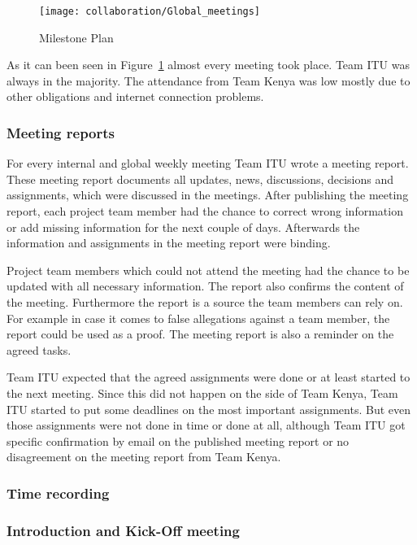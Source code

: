 	\begin{figure}[htb]
		\centering
		\texttt{[image: collaboration/Global\_meetings]}
		\caption{Milestone Plan}
		\label{fig:global_meetings}
	\end{figure}

As it can been seen in Figure~\ref{fig:global_meetings} almost every meeting took place. Team ITU was always in the majority. The attendance from Team Kenya was low mostly due to other obligations and internet connection problems.

\subsubsection {Meeting reports}

For every internal and global weekly meeting Team ITU wrote a meeting report. These meeting report documents all updates, news, discussions, decisions and assignments, which were discussed in the meetings. After publishing the meeting report, each project team member had the chance to correct wrong information or add missing information for the next couple of days. Afterwards the information and assignments in the meeting report were binding.

Project team members which could not attend the meeting had the chance to be updated with all necessary information. The report also confirms the content of the meeting. Furthermore the report is a source the team members can rely on. For example in case it comes to false allegations against a team member, the report could be used as a proof. The meeting report is also a reminder on the agreed tasks.

Team ITU expected that the agreed assignments were done or at least started to the next meeting. Since this did not happen on the side of Team Kenya, Team ITU started to put some deadlines on the most important assignments. But even those assignments were not done in time or done at all, although Team ITU got specific confirmation by email on the published meeting report or no disagreement on the meeting report from Team Kenya.

\subsubsection {Time recording}
\subsubsection {Introduction and Kick-Off meeting}
